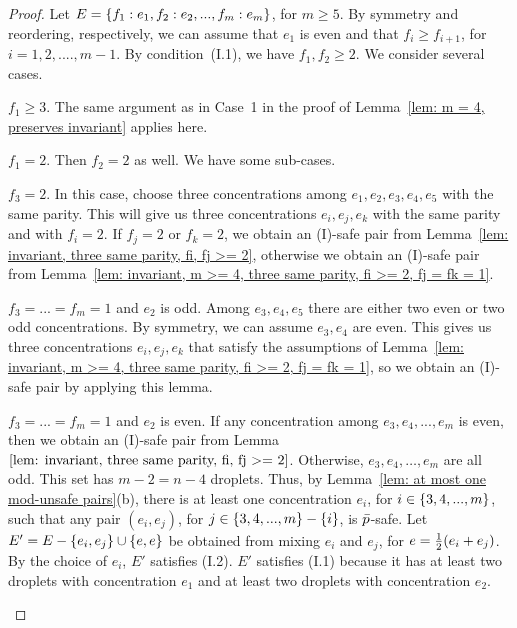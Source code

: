 \begin{proof}
Let $E = { \left\{ f_1:e_1, f_2:e_2, ... , f_m:e_m \right\} }$, for $m\ge 5$.
	By symmetry and reordering, respectively, we can assume that $e_1$ is even and that
	$f_i\ge f_{i+1}$, for $i=1,2,....,m-1$. By condition~(I.1), we have $f_1, f_2\ge 2$.
	We consider several cases.
	
	\smallskip\noindent
	 $f_1\ge 3$. The same	argument as in Case~1 in the proof of
			Lemma~\ref{lem: m = 4, preserves invariant} applies here.
	
	\smallskip\noindent
	 $f_1 = 2$. Then $f_2 = 2$ as well. We have some sub-cases.
	
	\vspace{-0.1in}
	
	\begin{description}
		\item{} $f_3 = 2$. In this case, choose three concentrations
			among $e_1,e_2,e_3,e_4,e_5$ with the same parity. This will give us
 			three concentrations $e_i,e_j,e_k$ with the same parity and with
			$f_i = 2$. If $f_j=2$ or $f_k = 2$,
			we obtain an (I)-safe pair from Lemma~\ref{lem: invariant, three same parity, fi, fj >= 2},
			otherwise we obtain an (I)-safe pair
			from Lemma~\ref{lem: invariant, m >= 4, three same parity, fi >= 2, fj = fk = 1}.
			
		\item{}	$f_3=...=f_m = 1$ and $e_2$ is odd. Among $e_3,e_4,e_5$ there
			are either two even or two odd concentrations. By symmetry, we can assume
			$e_3,e_4$ are even.	This gives us three concentrations $e_i,e_j,e_k$ that
			satisfy the assumptions of 
			Lemma~\ref{lem: invariant, m >= 4, three same parity, fi >= 2, fj = fk = 1},
			so we obtain an (I)-safe pair by applying this lemma.
		
		 \item{} $f_3=...=f_m = 1$ and $e_2$ is even.
		 	If any concentration among $e_3,e_4,...,e_m$ is even, then we obtain an (I)-safe pair
		 	from Lemma~$\ref{lem: invariant, three same parity, fi, fj >= 2}$.
			Otherwise, $e_3, e_4, \ldots, e_m$ are all odd. This set has $m-2 = n-4$ droplets.
			Thus, by Lemma~\ref{lem: at most one mod-unsafe pairs}(b), 
			there is at least one concentration $e_i$, for $i\in{ \left\{ 3,4,...,m \right\} }$, 
			such that any pair $(e_i,e_j)$,
			for $j\in{ \left\{ 3,4,...,m \right\} }-{ \left\{ i \right\} }$, is ${\bar{p}}$-safe.
			Let $E' = E - { \left\{ e_i,e_j \right\} }\cup { \left\{ e,e \right\} }$ be obtained from mixing $e_i$ and $e_j$,
			for $e = {\textstyle\frac{1}{2}}(e_i+e_j)$.
			By the choice of $e_i$, $E'$ satisfies (I.2).
			$E'$ satisfies (I.1) because it has at least two droplets with concentration $e_1$ and 
			at least two droplets with concentration $e_2$.
	\end{description}	
\end{proof}

